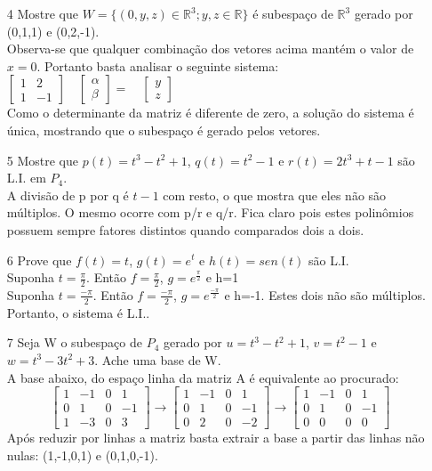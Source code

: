 \documentclass[a4paper]{article}
\begin{document}
\begin{itemize}
\item[4] Mostre que $W=\{(0,y,z)\in \mathbb{R}^3;y,z \in \mathbb{R}\}$ é subespaço  de $\mathbb{R}^3$ gerado por (0,1,1) e (0,2,-1).
\\ \textcolor[rgb]{0,0,1}{
Observa-se que qualquer combinação dos vetores acima mantém o valor de $x=0$. Portanto basta analisar o seguinte sistema:
\\
$
\left[\begin{array}{rr}
1&2\\
1&-1
\end{array}\right]
\quad
\left[\begin{array}{c}
\alpha\\
\beta
\end{array}\right]
=
\quad
\left[\begin{array}{c}
y\\
z
\end{array}\right]
$
\\ Como o determinante da matriz é diferente de zero, a solução do sistema é única, mostrando que o subespaço é gerado pelos vetores.
}

\item[5] Mostre que $p(t)=t^3-t^2+1$, $q(t)=t^2-1$ e $r(t)=2t^3+t-1$ são L.I. em $P_4$.
\\ \textcolor[rgb]{0,0,1}{A divisão de p por q é $t-1$ com resto, o que mostra que eles não são múltiplos. O mesmo ocorre com p/r e q/r. Fica claro pois estes polinômios possuem sempre fatores distintos quando comparados dois a dois.}
\item[6] Prove que $f(t)=t$, $g(t)=e^t$ e $h(t)=sen(t)$ são L.I.\\
\textcolor[rgb]{0,0,1}{Suponha $t=\frac{\pi}{2}$. Então $f=\frac{\pi}{2}$, $g=e^{\frac{\pi}{2}}$ e h=1
\\Suponha $t=\frac{-\pi}{2}$. Então $f=\frac{-\pi}{2}$, $g=e^{\frac{-\pi}{2}}$ e h=-1.
Estes dois não são múltiplos. Portanto, o sistema é L.I.}.


\item[7] Seja W o subespaço de $P_4$ gerado por $u=t^3-t^2+1$, $v=t^2-1$ e $w=t^3-3t^2+3$. Ache uma base de W.
\\\textcolor[rgb]{0,0,1}{A base abaixo, do espaço linha da matriz A é equivalente ao procurado:
$$
\left[\begin{array}{rrrr}
1&-1&0&1\\
0&1&0&-1\\
1&-3&0&3
\end{array}\right]
\rightarrow
\left[\begin{array}{rrrr}
1&-1&0&1\\
0&1&0&-1\\
0&2&0&-2
\end{array}\right]
\rightarrow
\left[\begin{array}{rrrr}
1&-1&0&1\\
0&1&0&-1\\
0&0&0&0
\end{array}\right]
$$
Após reduzir por linhas a matriz basta extrair a base a partir das linhas não nulas:
(1,-1,0,1) e (0,1,0,-1).}


\end{itemize}
\end{document}

